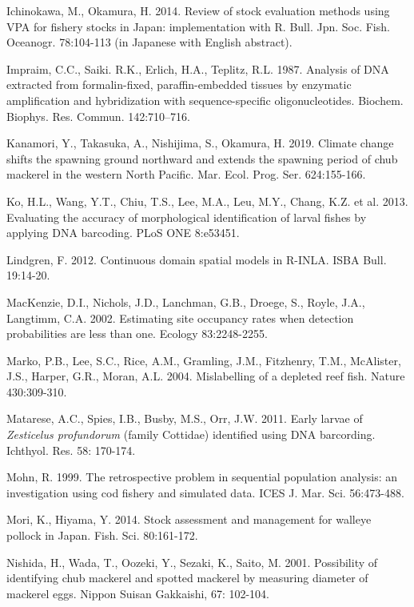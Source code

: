 \documentclass[12pt]{article}
\begin{document}
\begin{linenumbers}
\hangindent=30pt
\noindent
Ichinokawa, M., Okamura, H. 2014. Review of stock evaluation methods using VPA for fishery stocks in Japan: implementation with R. Bull. Jpn. Soc. Fish. Oceanogr. 78:104-113 (in Japanese with English abstract).

\hangindent=30pt
\noindent
Impraim, C.C., Saiki. R.K., Erlich, H.A., Teplitz, R.L. 1987. Analysis of DNA extracted from formalin-fixed, paraffin-embedded tissues by enzymatic amplification and hybridization with sequence-specific oligonucleotides. Biochem. Biophys. Res. Commun. 142:710–716.

\hangindent=30pt
\noindent
Kanamori, Y., Takasuka, A., Nishijima, S., Okamura, H. 2019. Climate change shifts the spawning ground northward and extends the spawning period of chub mackerel in the western North Pacific. Mar. Ecol. Prog. Ser. 624:155-166.

\hangindent=30pt
\noindent
Ko, H.L., Wang, Y.T., Chiu, T.S., Lee, M.A., Leu, M.Y., Chang, K.Z. et al. 2013. Evaluating the accuracy of morphological identification of larval fishes by applying DNA barcoding. PLoS ONE 8:e53451.

\hangindent=30pt
\noindent
Lindgren, F. 2012. Continuous domain spatial models in R-INLA. ISBA Bull. 19:14-20.

\hangindent=30pt
\noindent
MacKenzie, D.I., Nichols, J.D., Lanchman, G.B., Droege, S., Royle, J.A., Langtimm, C.A. 2002. Estimating site occupancy rates when detection probabilities are less than one. Ecology 83:2248-2255.

\hangindent=30pt
\noindent
Marko, P.B., Lee, S.C., Rice, A.M., Gramling, J.M., Fitzhenry, T.M., McAlister, J.S., Harper, G.R., Moran, A.L. 2004. Mislabelling of a depleted reef fish. Nature 430:309-310.

\hangindent=30pt
\noindent
Matarese, A.C., Spies, I.B., Busby, M.S., Orr, J.W. 2011. Early larvae of \textit{Zesticelus profundorum} (family Cottidae) identified using DNA barcording. Ichthyol. Res. 58: 170-174.

\hangindent=30pt
\noindent
Mohn, R. 1999. The retrospective problem in sequential population analysis: an investigation using cod fishery and simulated data. ICES J. Mar. Sci. 56:473-488.

\hangindent=30pt
\noindent
Mori, K., Hiyama, Y. 2014. Stock assessment and management for walleye pollock in Japan. Fish. Sci. 80:161-172.

\hangindent=30pt
\noindent
Nishida, H., Wada, T., Oozeki, Y., Sezaki, K., Saito, M. 2001. Possibility of identifying chub mackerel and spotted mackerel by measuring diameter of mackerel eggs. Nippon Suisan Gakkaishi, 67: 102-104.


\end{linenumbers}
\end{document}
